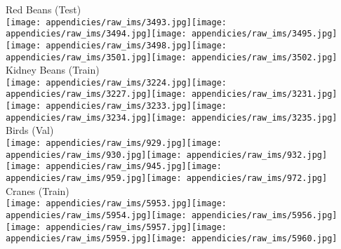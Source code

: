 \documentclass[letterpaper, 11pt]{IEEEtran}
\begin{document}
\begin{figure*}[!ht]
 Red Beans (Test)\\  \vspace{0.2em}
\texttt{[image: appendicies/raw\_ims/3493.jpg]}\texttt{[image: appendicies/raw\_ims/3494.jpg]}\texttt{[image: appendicies/raw\_ims/3495.jpg]}\texttt{[image: appendicies/raw\_ims/3498.jpg]}\texttt{[image: appendicies/raw\_ims/3501.jpg]}\texttt{[image: appendicies/raw\_ims/3502.jpg]}\\  \vspace{0.2em}
 Kidney Beans (Train)\\  \vspace{0.2em}
\texttt{[image: appendicies/raw\_ims/3224.jpg]}\texttt{[image: appendicies/raw\_ims/3227.jpg]}\texttt{[image: appendicies/raw\_ims/3231.jpg]}\texttt{[image: appendicies/raw\_ims/3233.jpg]}\texttt{[image: appendicies/raw\_ims/3234.jpg]}\texttt{[image: appendicies/raw\_ims/3235.jpg]}\\  \vspace{0.2em}
 Birds (Val)\\  \vspace{0.2em}
\texttt{[image: appendicies/raw\_ims/929.jpg]}\texttt{[image: appendicies/raw\_ims/930.jpg]}\texttt{[image: appendicies/raw\_ims/932.jpg]}\texttt{[image: appendicies/raw\_ims/945.jpg]}\texttt{[image: appendicies/raw\_ims/959.jpg]}\texttt{[image: appendicies/raw\_ims/972.jpg]}\\  \vspace{0.2em}
 Cranes (Train)\\  \vspace{0.2em}
\texttt{[image: appendicies/raw\_ims/5953.jpg]}\texttt{[image: appendicies/raw\_ims/5954.jpg]}\texttt{[image: appendicies/raw\_ims/5956.jpg]}\texttt{[image: appendicies/raw\_ims/5957.jpg]}\texttt{[image: appendicies/raw\_ims/5959.jpg]}\texttt{[image: appendicies/raw\_ims/5960.jpg]}\\  \vspace{0.2em}

\end{figure*}
\end{document}
